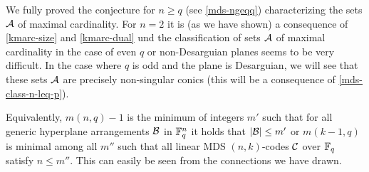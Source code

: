 \begin{remark}%
    We fully proved the conjecture for $n\geq q$ (see \autoref{mds-ngeqq}) characterizing the sets $\mathcal{A}$ of maximal cardinality. For $n=2$ it is (as we have shown) a consequence of \autoref{kmarc-size} and \autoref{kmarc-dual} und the classification of sets $\mathcal{A}$ of maximal cardinality in the case of even $q$ or non-Desarguian planes seems to be very difficult. In the case where $q$ is odd and the plane is Desarguian, we will see that these sets $\mathcal{A}$ are precisely non-singular conics (this will be a consequence of \autoref{mds-class-n-leq-p}). 
\end{remark}

\begin{remark}\label{mds-mainconjotherobj}
    Equivalently, $m(n,q)-1$ is the minimum of integers $m'$ such that for all generic hyperplane arrangements $\mathcal{B}$ in $\mathbb{F}_{q}^n$ it holds that $\left|\mathcal{B}\right|\leq m'$ or $m(k-1,q)$ is minimal among all $m''$ such that all linear MDS $(n,k)$-codes $\mathcal{C}$ over $\mathbb{F}_{q}$ satisfy $n\leq m''$. This can easily be seen from the connections we have drawn.
\end{remark}





